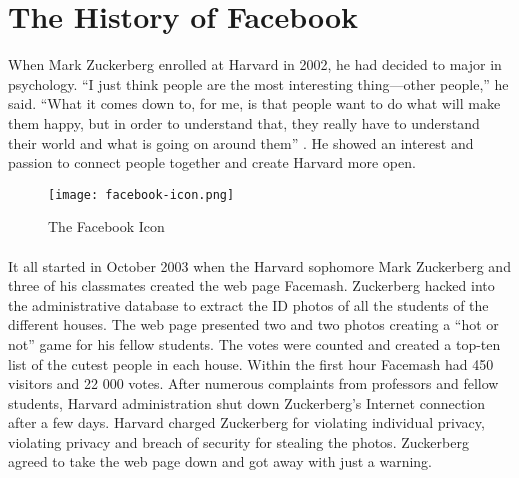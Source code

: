\section{The History of Facebook}
\label{sec:facebookhistory}
When Mark Zuckerberg enrolled at Harvard in 2002, he had decided to major in psychology. “I just think people are the most interesting thing—other people,” he said. “What it comes down to, for me, is that people want to do what will make them happy, but in order to understand that, they really have to understand their world and what is going on around them” \cite{MeMedia}. He showed an interest and passion to connect people together and create Harvard more open. 

\begin{figure}[h!]
\centering
\texttt{[image: facebook-icon.png]}
\caption{The Facebook Icon}
\end{figure}

\paragraph{}
It all started in October 2003 when the Harvard sophomore Mark Zuckerberg and three of his classmates created the web page Facemash. Zuckerberg hacked into the administrative database to extract the ID photos of all the students of the different houses. The web page presented two and two photos creating a “hot or not” game for his fellow students. The votes were counted and created a top-ten list of the cutest people in each house. Within the first hour Facemash had 450 visitors and 22 000 votes. After numerous complaints from professors and fellow students, Harvard administration shut down Zuckerberg's Internet connection after a few days. Harvard charged Zuckerberg for violating individual privacy, violating privacy and breach of security for stealing the photos. Zuckerberg agreed to take the web page down and got away with just a warning.

